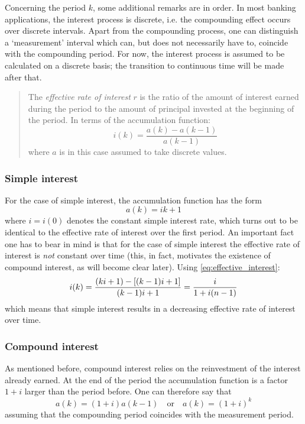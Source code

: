 Concerning the period \(k\), some additional remarks are in order. In most banking applications, the interest process is discrete, i.e. the compounding effect occurs over discrete intervals. Apart from the compounding process, one can distinguish a `measurement' interval which can, but does not necessarily have to, coincide with the compounding period. For now, the interest process is assumed to be calculated on a discrete basis; the transition to continuous time will be made after that.

\begin{quote}
    The \emph{effective rate of interest} \(r\) is the ratio of the amount of interest earned during the period to the amount of principal invested at the beginning of the period. In terms of the accumulation function:
     \begin{equation}
         i(k) = \frac{a(k) - a(k-1)}{a(k-1)}
         \label{eq:effective_interest}
     \end{equation}
     where \(a\) is in this case assumed to take discrete values.
\end{quote}

\begin{quote}
    
\end{quote}

\subsubsection{Simple interest}
For the case of simple interest, the accumulation function has the form
\[
     a(k) = ik + 1
\] 
where \(i = i(0)\) denotes the constant simple interest rate, which turns out to be identical to the effective rate of interest over the first period. An important fact one has to bear in mind is that for the case of simple interest the effective rate of interest is \emph{not} constant over time (this, in fact, motivates the existence of compound interest, as will become clear later). Using \cref{eq:effective_interest}:
\[
     i(k) = \frac{\qty(ki + 1) - \qty[(k-1)i + 1]}{(k-1)i + 1} = \frac{i}{1 + i(n-1)}
\]
which means that simple interest results in a decreasing effective rate of interest over time. \cite{Kellison1991}

\subsubsection{Compound interest}
As mentioned before, compound interest relies on the reinvestment of the interest already earned. At the end of the period the accumulation function is a factor \(1 + i\) larger than the period before. One can therefore say that
\[
     a(k) = (1 + i)a(k-1)\quad\text{or}\quad a(k) = (1 + i)^{k}
\]
assuming that the compounding period coincides with the measurement period. 

